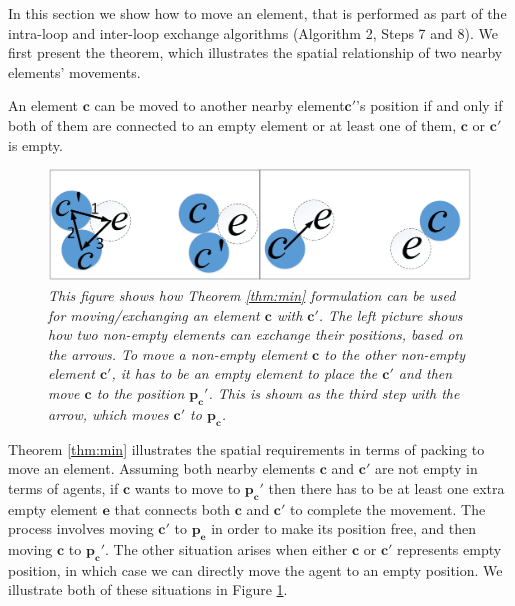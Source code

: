 In this section we show how to move an element, that is performed as part of the intra-loop and inter-loop exchange algorithms (Algorithm 2, Steps 7 and 8). We first present the theorem, which illustrates the spatial relationship of two nearby elements' movements. 
\begin{theorem}
An element $\mathbf{c}$ can be moved to another nearby element$\mathbf{c'}$'s position 
if and only if both of them are connected to an empty element 
or at least one of them, $\mathbf{c}$ or $\mathbf{c'}$ is empty. 
\label{thm:min}
\end{theorem}
\begin{figure}[!ht]
\centering
\includegraphics[width=0.5\linewidth]{figs/exchange.png}
\caption{\em This figure shows how Theorem \ref{thm:min} formulation can be used for moving/exchanging an element $\mathbf{c}$ with $\mathbf{c'}$.
The left picture shows how two non-empty elements can exchange their positions, based on the arrows. 
To move a non-empty element $\mathbf{c}$ to the other non-empty element $\mathbf{c'}$, it has to be an empty element to place the $\mathbf{c'}$ and then move $\mathbf{c}$ to the position $\mathbf{p_c'}$. This is shown as the third step with the arrow, which moves $\mathbf{c'}$ to $\mathbf{p_c}$. 
}
\label{fig:exchange}
\vspace*{-0.2in}
\end{figure}
Theorem \ref{thm:min} illustrates the spatial requirements in terms of packing to move an element.   
Assuming both nearby elements $\mathbf{c}$ and $\mathbf{c'}$ are not empty in terms of agents, if $\mathbf{c}$ wants to move to $\mathbf{p_c'}$ then there has to be at least one extra empty element $\mathbf{e}$ that connects both  $\mathbf{c}$ and  $\mathbf{c'}$ to complete the movement. The process involves moving $\mathbf{c'}$ to $\mathbf{p_e}$ in order to make its position free, and then moving $\mathbf{c}$ to $\mathbf{p_c'}$. The other situation arises when either $\mathbf{c}$ or $\mathbf{c'}$ represents empty position, in which case we can directly move the agent to an empty position. We illustrate both of these situations in Figure \ref{fig:exchange}.

